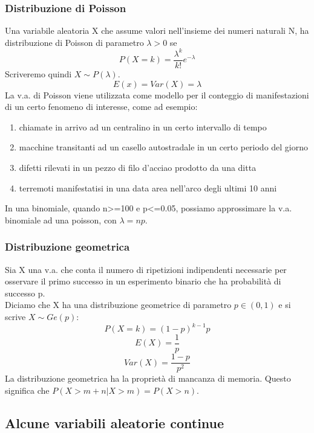 \documentclass{article}
\begin{document}
\subsubsection{Distribuzione di Poisson}
Una variabile aleatoria X che assume valori nell'insieme dei numeri naturali N, ha distribuzione di Poisson di parametro $\lambda>0$ se
\begin{equation}
P(X=k)=\frac{\lambda^k}{k!}e^{-\lambda}
\end{equation}
Scriveremo quindi $X\sim P(\lambda)$.
\begin{equation}
E(x)=Var(X)=\lambda
\end{equation}
La v.a. di Poisson viene utilizzata come modello per il conteggio di manifestazioni di un certo fenomeno di interesse, come ad esempio:
\begin{enumerate}
\item chiamate in arrivo ad un centralino in un certo intervallo di tempo
\item macchine transitanti ad un casello autostradale in un certo periodo del giorno
\item difetti rilevati in un pezzo di filo d'acciao prodotto da una ditta
\item terremoti manifestatisi in una data area nell'arco degli ultimi 10 anni
\end{enumerate}
In una binomiale, quando n>=100 e p<=0.05, possiamo approssimare la v.a. binomiale ad una poisson, con $\lambda=np$.
\subsubsection{Distribuzione geometrica}
Sia X una v.a. che conta il numero di ripetizioni indipendenti necessarie per osservare il primo successo in un esperimento binario che ha probabilità di successo p.\\
Diciamo che X ha una distribuzione geometrice di parametro $p\in (0,1)$ e si scrive $X\sim Ge(p)$:
\begin{equation}
P(X=k)=(1-p)^{k-1}p
\end{equation}
\begin{equation}
E(X)=\frac{1}{p}
\end{equation}
\begin{equation}
Var(X)=\frac{1-p}{p^2}
\end{equation}
La distribuzione geometrica ha la proprietà di mancanza di memoria. Questo significa che $P(X>m+n|X>m)=P(X>n)$.
\subsection{Alcune variabili aleatorie continue}
\end{document}
